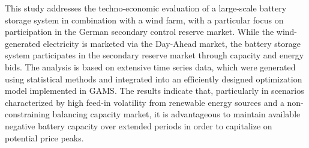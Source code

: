 This study addresses the techno-economic evaluation of a large-scale battery storage system
in combination with a wind farm, with a particular focus on participation in the German
secondary control reserve market. While the wind-generated electricity is marketed via the Day-Ahead market,
the battery storage system participates in the secondary reserve market through
capacity and energy bids. The analysis is based on extensive time series data,
which were generated using statistical methods and integrated into
an efficiently designed optimization model implemented in GAMS.
The results indicate that, particularly in scenarios characterized by high feed-in volatility
from renewable energy sources and a non-constraining balancing capacity market,
it is advantageous to maintain available negative battery capacity over extended periods
in order to capitalize on potential price peaks.

